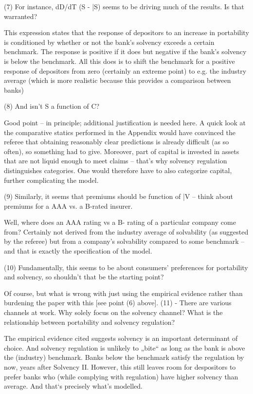  
(7) For instance, dD/dT (S - \bar{S}) seems to be driving much of the results. Is that warranted? 

This expression states that the response of depositors to an increase in portability is conditioned by whether or not the bank’s solvency exceeds a certain benchmark. The response is positive if it does but negative if the bank’s solvency is below the benchmark. All this does is to shift the benchmark for a positive response of depositors from zero (certainly an  extreme point) to e.g. the industry average (which is more realistic because this provides a comparison between banks)


(8) And isn't S a function of C? 

Good point – in principle; additional justification is needed here. A quick look at the comparative statics performed in the Appendix would have convinced the referee that obtaining reasonably clear predictions is already difficult (as so often), so something had to give. Moreover, part of capital is invested in assets that are not liquid enough to meet claims – that’s why solvency regulation distinguishes categories. One would therefore have to also categorize capital, further complicating the model.  
  
(9) Similarly, it seems that premiums should be function of \bar{V} -- think about premiums for a AAA vs. a B-rated insurer.

Well, where does an AAA rating vs a B- rating of a particular company come from? Certainly not derived from the industry average of solvability (as suggested by the referee) but from a company’s solvability compared to some benchmark – and that is exactly the specification of the model.


(10) Fundamentally, this seems to be about consumers' preferences for portability and solvency, so shouldn't that be the starting point?

Of course, but what is wrong with just using the empirical evidence rather than burdening the paper with this [see point (6) above]. 
(11) - There are various channels at work. Why solely focus on the solvency channel? What is the relationship between portability and solvency regulation? 

The empirical evidence cited suggests solvency is an important determinant of choice. And solvency regulation is unlikely to „bite“ as long as the bank is above the (industry) benchmark.  Banks below the benchmark satisfy the regulation by now, years after Solvency II. However, this still leaves room for despositors to prefer banks who (while complying with regulation) have higher solvency than average. And that‘s precisely what’s modelled.

